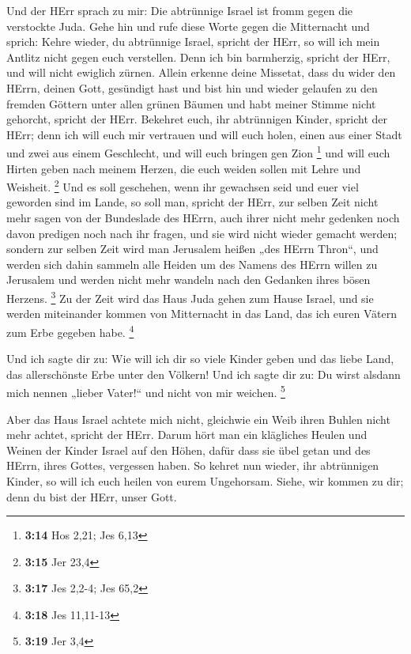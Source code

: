  Und der HErr sprach zu mir: Die abtrünnige Israel ist
fromm gegen die verstockte Juda.  Gehe hin und rufe diese
Worte gegen die Mitternacht und sprich: Kehre wieder, du abtrünnige
Israel, spricht der HErr, so will ich mein Antlitz nicht gegen euch
verstellen. Denn ich bin barmherzig, spricht der HErr, und will nicht
ewiglich zürnen.  Allein erkenne deine Missetat, dass du
wider den HErrn, deinen Gott, gesündigt hast und bist hin und wieder
gelaufen zu den fremden Göttern unter allen grünen Bäumen und habt
meiner Stimme nicht gehorcht, spricht der HErr.  Bekehret
euch, ihr abtrünnigen Kinder, spricht der HErr; denn ich will euch mir
vertrauen und will euch holen, einen aus einer Stadt und zwei aus einem
Geschlecht, und will euch bringen gen Zion \footnote{\textbf{3:14} Hos
  2,21; Jes 6,13}  und will euch Hirten geben nach meinem
Herzen, die euch weiden sollen mit Lehre und Weisheit. \footnote{\textbf{3:15}
  Jer 23,4}  Und es soll geschehen, wenn ihr gewachsen seid
und euer viel geworden sind im Lande, so soll man, spricht der HErr, zur
selben Zeit nicht mehr sagen von der Bundeslade des HErrn, auch ihrer
nicht mehr gedenken noch davon predigen noch nach ihr fragen, und sie
wird nicht wieder gemacht werden;  sondern zur selben Zeit
wird man Jerusalem heißen „des HErrn Thron``, und werden sich dahin
sammeln alle Heiden um des Namens des HErrn willen zu Jerusalem und
werden nicht mehr wandeln nach den Gedanken ihres bösen Herzens.
\footnote{\textbf{3:17} Jes 2,2-4; Jes 65,2}  Zu der Zeit
wird das Haus Juda gehen zum Hause Israel, und sie werden miteinander
kommen von Mitternacht in das Land, das ich euren Vätern zum Erbe
gegeben habe. \footnote{\textbf{3:18} Jes 11,11-13}

 Und ich sagte dir zu: Wie will ich dir so viele Kinder
geben und das liebe Land, das allerschönste Erbe unter den Völkern! Und
ich sagte dir zu: Du wirst alsdann mich nennen „lieber Vater!{}`` und
nicht von mir weichen. \footnote{\textbf{3:19} Jer 3,4}

 Aber das Haus Israel achtete mich nicht, gleichwie ein
Weib ihren Buhlen nicht mehr achtet, spricht der HErr. 
Darum hört man ein klägliches Heulen und Weinen der Kinder Israel auf
den Höhen, dafür dass sie übel getan und des HErrn, ihres Gottes,
vergessen haben.  So kehret nun wieder, ihr abtrünnigen
Kinder, so will ich euch heilen von eurem Ungehorsam. Siehe, wir kommen
zu dir; denn du bist der HErr, unser Gott.

